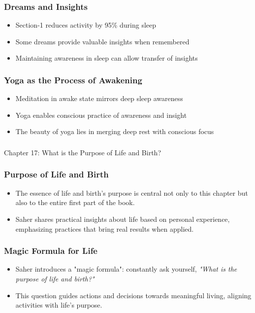 \begin{frame}[fragile]\frametitle{Dreams and Insights}
    \begin{itemize}
        \item Section-1 reduces activity by 95\% during sleep
        \item Some dreams provide valuable insights when remembered
        \item Maintaining awareness in sleep can allow transfer of insights
    \end{itemize}
\end{frame}

\begin{frame}[fragile]\frametitle{Yoga as the Process of Awakening}
    \begin{itemize}
        \item Meditation in awake state mirrors deep sleep awareness
        \item Yoga enables conscious practice of awareness and insight
        \item The beauty of yoga lies in merging deep rest with conscious focus
    \end{itemize}
\end{frame}


\begin{frame}[fragile]\frametitle{}
\begin{center}
{\Large Chapter 17: What is the Purpose of Life and Birth?}
\end{center}
\end{frame}

\begin{frame}[fragile]\frametitle{Purpose of Life and Birth}
    \begin{itemize}
        \item The essence of life and birth's purpose is central not only to this chapter but also to the entire first part of the book.
        \item Saher shares practical insights about life based on personal experience, emphasizing practices that bring real results when applied.
    \end{itemize}
\end{frame}

\begin{frame}[fragile]\frametitle{Magic Formula for Life}
    \begin{itemize}
        \item Saher introduces a "magic formula": constantly ask yourself, \textit{"What is the purpose of life and birth?"}
        \item This question guides actions and decisions towards meaningful living, aligning activities with life's purpose.
    \end{itemize}
\end{frame}

